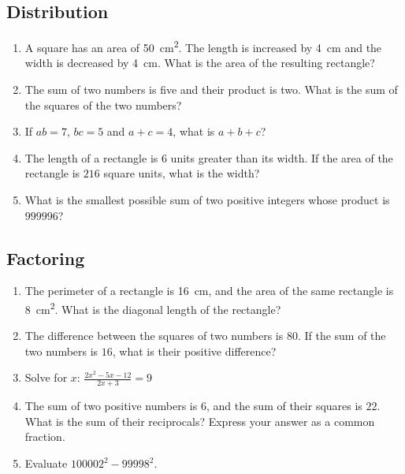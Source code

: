 \documentclass{article}
\begin{document}
    \subsection*{Distribution}
    \begin{enumerate}
        \item A square has an area of \SI{50}{\centi\meter\squared}. The length is increased by \SI{4}{\centi\meter} and the width is decreased by \SI{4}{\centi\meter}. What is the area of the resulting rectangle?
        \vspace{3cm}
        \item The sum of two numbers is five and their product is two. What is the sum of the squares of the two numbers?
        \vspace{3cm}
        \item If $ab = 7$, $bc = 5$ and $a + c = 4$, what is $a + b + c$?
        \vspace{3cm}
        \item The length of a rectangle is $6$ units greater than its width. If the area of the rectangle is $216$ square units, what is the width?
        \vspace{3cm}
        \item What is the smallest possible sum of two positive integers whose product is $999996$?
        \vspace{3cm}
    \end{enumerate}
    \subsection*{Factoring}
    \begin{enumerate}[resume]
        \item The perimeter of a rectangle is \SI{16}{\centi\meter}, and the area of the same rectangle is \SI{8}{\centi\meter\squared}. What is the diagonal length of the rectangle?
        \vspace{3cm}
        \item The difference between the squares of two numbers is $80$. If the sum of the two numbers is $16$, what is their positive difference?
        \vspace{3cm}
        \item Solve for $x$: $\frac{2x^2 - 5x - 12}{2x + 3} = 9$
        \vspace{3cm}
        \item The sum of two positive numbers is $6$, and the sum of their squares is $22$. What is the sum of their reciprocals? Express your answer as a common fraction.
        \vspace{3cm}
        \item Evaluate $100002^2 - 99998^2$.
        \vspace{3cm}
    \end{enumerate}
\end{document}
